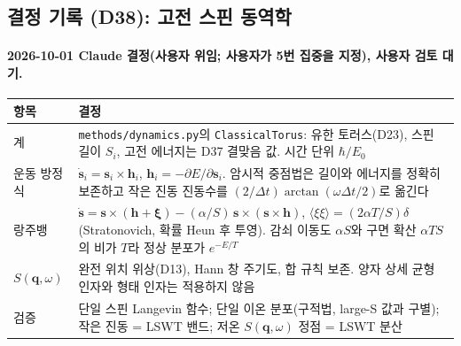 \subsection{결정 기록 (D38): 고전 스핀 동역학}\label{decisions-d38-dynamics}
\begingroup%
  \framesubtitle{2026-10-01 Claude 결정(사용자 위임; 사용자가 5번 집중을 지정), 사용자 검토 대기.}
  \small\renewcommand{\arraystretch}{1.12}
  \begin{tabularx}{\textwidth}{@{}P{3.0cm}Y@{}}
    \toprule
    항목 & 결정 \\
    \midrule
    계 & \texttt{methods/dynamics.py}의 \texttt{ClassicalTorus}: 유한 토러스(D23), 스핀 길이 $S_i$, 고전 에너지는 D37 결맞음 값. 시간 단위 $\hbar/E_0$ \\
    운동 방정식 & $\dot{\mathbf s}_i=\mathbf s_i\times\mathbf h_i$, $\mathbf h_i=-\partial E/\partial\mathbf s_i$. 암시적 중점법은 길이와 에너지를 정확히 보존하고 작은 진동 진동수를 $(2/\Delta t)\arctan(\omega\Delta t/2)$로 옮긴다 \\
    랑주뱅 & $\dot{\mathbf s}=\mathbf s\times(\mathbf h+\boldsymbol\xi)-(\alpha/S)\,\mathbf s\times(\mathbf s\times\mathbf h)$, $\langle\xi\xi\rangle=(2\alpha T/S)\delta$ (Stratonovich, 확률 Heun 후 투영). 감쇠 이동도 $\alpha S$와 구면 확산 $\alpha TS$의 비가 $T$라 정상 분포가 $e^{-E/T}$ \\
    $S(\mathbf q,\omega)$ & 완전 위치 위상(D13), Hann 창 주기도, 합 규칙 보존. 양자 상세 균형 인자와 형태 인자는 적용하지 않음 \\
    검증 & 단일 스핀 Langevin 함수; 단일 이온 분포(구적법, large-S 값과 구별); 작은 진동 = LSWT 밴드; 저온 $S(\mathbf q,\omega)$ 정점 = LSWT 분산 \\
    \bottomrule
  \end{tabularx}
\endgroup


